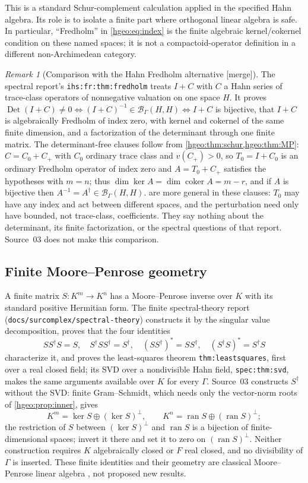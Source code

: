 \documentclass[11pt,letterpaper]{article}
\numberwithin{equation}{section}
\theoremstyle{definition}
\theoremstyle{remark}
\newtheorem{remark}[remark]{Remark}
\newcommand{\F}{F}
\newcommand{\K}{K}
\newcommand{\BH}{\mathscr B_\Gamma(H,H)}
\newcommand{\ran}{\operatorname{ran}}
\newcommand{\Det}{\operatorname{Det}}
\newcommand{\coker}{\operatorname{coker}}
\newcommand{\mergetag}{\textup{\textsf{\small[merge]}}}
\newcommand{\replabel}[1]{\nolinkurl{#1}}
\newcommand{\fn}[1]{\nolinkurl{#1}}
\begin{document}
This is a standard Schur-complement calculation applied in the
specified Hahn algebra. Its role is to isolate a finite part where
orthogonal linear algebra is safe. In particular, ``Fredholm'' in
\eqref{hgeo:eq:index} is the finite algebraic kernel/cokernel condition
on these named spaces; it is not a compactoid-operator definition in
a different non-Archimedean category.

\begin{remark}[Comparison with the Hahn Fredholm alternative \mergetag]
\label{hgeo:rem:fredholm}
The spectral report's \replabel{ihs:fr:thm:fredholm} treats $I+C$ with $C$
a Hahn series of trace-class operators of nonnegative valuation on one
space $H$. It proves $\Det(I+C)\ne0\iff(I+C)^{-1}\in\BH\iff I+C$ is
bijective, that $I+C$ is algebraically Fredholm of index zero, with kernel
and cokernel of the same finite dimension, and a factorization of the
determinant through one finite matrix. The determinant-free clauses follow
from \cref{hgeo:thm:schur,hgeo:thm:MP}: $C=C_0+C_+$ with $C_0$ ordinary
trace class and $v(C_+)>0$, so $T_0=I+C_0$ is an ordinary Fredholm operator
of index zero and $A=T_0+C_+$ satisfies the hypotheses with $m=n$; thus
$\dim\ker A=\dim\coker A=m-r$, and if $A$ is bijective then
$A^{-1}=A^\dagger\in\BH$.  are more general
in these clauses: $T_0$ may have any index and act between different spaces,
and the perturbation need only have bounded, not trace-class, coefficients.
They say nothing about the determinant, its finite factorization, or the
spectral questions of that report. Source~03 does not make this comparison.
\end{remark}

\subsection{Finite Moore--Penrose geometry}
A finite matrix $S:\K^m\to\K^n$ has a Moore--Penrose inverse over $\K$ with
its standard positive Hermitian form. The finite spectral-theory report
(\fn{docs/surcomplex/spectral-theory}) constructs it by the singular value
decomposition, proves that the four identities
\begin{equation}\label{hgeo:eq:penrose}
 SS^\dagger S=S,\quad S^\dagger SS^\dagger=S^\dagger,
 \quad (SS^\dagger)^*=SS^\dagger,
 \quad (S^\dagger S)^*=S^\dagger S
\end{equation}
characterize it, and proves the least-squares theorem
\replabel{thm:leastsquares}, first over a real closed field; its SVD over a
nondivisible Hahn field, \replabel{spec:thm:svd}, makes the same arguments
available over $\K$ for every $\Gamma$. Source~03 constructs $S^\dagger$
without the SVD: finite Gram--Schmidt, which needs only the vector-norm roots
of \cref{hgeo:prop:inner}, gives
\[
 \K^m=\ker S\oplus(\ker S)^\perp,\qquad
 \K^n=\ran S\oplus(\ran S)^\perp;
\]
the restriction of $S$ between $(\ker S)^\perp$ and $\ran S$ is a bijection
of finite-dimensional spaces; invert it there and set it to zero on
$(\ran S)^\perp$. Neither construction requires $\K$ algebraically closed
or $\F$ real closed, and no divisibility of $\Gamma$ is inserted. These
finite identities and their geometry are classical Moore--Penrose linear
algebra \cite{Penrose}, not proposed new results.
\end{document}
